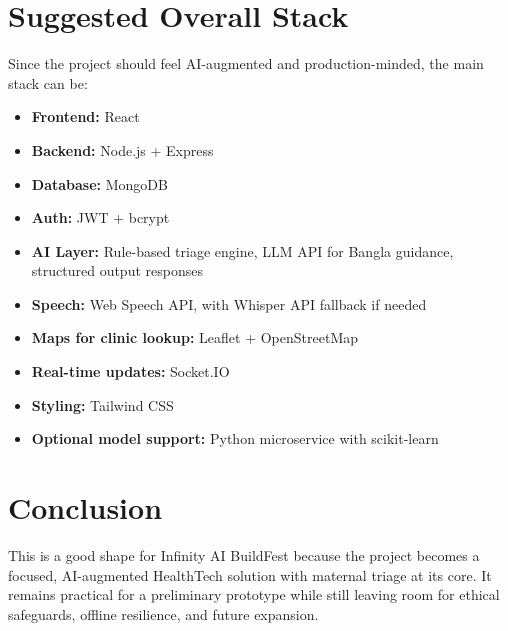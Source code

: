 \documentclass[11pt]{article}
\begin{document}
\section{Suggested Overall Stack}
Since the project should feel AI-augmented and production-minded, the main stack can be:

\begin{itemize}
    \item \textbf{Frontend:} React
    \item \textbf{Backend:} Node.js + Express
    \item \textbf{Database:} MongoDB
    \item \textbf{Auth:} JWT + bcrypt
    \item \textbf{AI Layer:} Rule-based triage engine, LLM API for Bangla guidance, structured output responses
    \item \textbf{Speech:} Web Speech API, with Whisper API fallback if needed
    \item \textbf{Maps for clinic lookup:} Leaflet + OpenStreetMap
    \item \textbf{Real-time updates:} Socket.IO
    \item \textbf{Styling:} Tailwind CSS
    \item \textbf{Optional model support:} Python microservice with scikit-learn
\end{itemize}

\section{Conclusion}
This is a good shape for Infinity AI BuildFest because the project becomes a focused, AI-augmented HealthTech solution with maternal triage at its core. It remains practical for a preliminary prototype while still leaving room for ethical safeguards, offline resilience, and future expansion.
\end{document}
